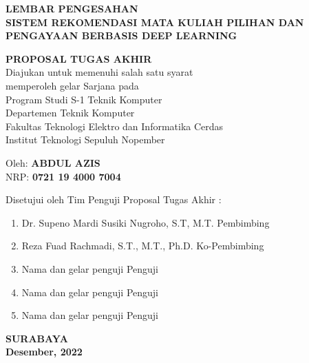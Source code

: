 {
\begin{center}
    \uppercase{\textbf{\large Lembar Pengesahan}} \\

    \vspace*{10mm}
    \uppercase{\textbf{Sistem rekomendasi Mata Kuliah Pilihan dan Pengayaan berbasis Deep Learning}}
    \vspace*{10mm}

    {
        \uppercase{\textbf{Proposal Tugas Akhir}} \\
        Diajukan untuk memenuhi salah satu syarat          \\
        memperoleh gelar Sarjana pada                      \\
        Program Studi S-1 Teknik Komputer                  \\
        Departemen Teknik Komputer                         \\
        Fakultas Teknologi Elektro dan Informatika Cerdas  \\
        Institut Teknologi Sepuluh Nopember                \\
    }

    \vspace*{1.5cm}
    Oleh: \textbf{\uppercase{Abdul Azis}}                          \\
    NRP: \textbf{0721 19 4000 7004}                    \\
    \vspace*{1.5cm}

    Disetujui oleh Tim Penguji Proposal Tugas Akhir :  \\
    \vspace*{5mm}

    \begin{enumerate}
        \setlength\itemsep{1.5em}
        \item Dr. Supeno Mardi Susiki Nugroho, S.T, M.T. \hfill Pembimbing
        \item Reza Fuad Rachmadi, S.T., M.T., Ph.D. \hfill Ko-Pembimbing
        \item Nama dan gelar penguji \hfill Penguji
        \item Nama dan gelar penguji \hfill Penguji
        \item Nama dan gelar penguji \hfill Penguji
    \end{enumerate}

    \vspace*{1.5cm}
    \uppercase{\textbf{surabaya}}                      \\
    \textbf{Desember, 2022}                              \\
\end{center}
}
